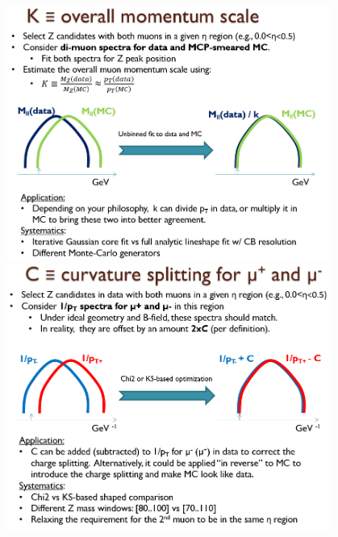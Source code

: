 {
\includegraphics[width=0.8\textwidth]{dates/mtg/figures/mcp/K}
}
{
\includegraphics[width=0.8\textwidth]{dates/mtg/figures/mcp/C}
}


